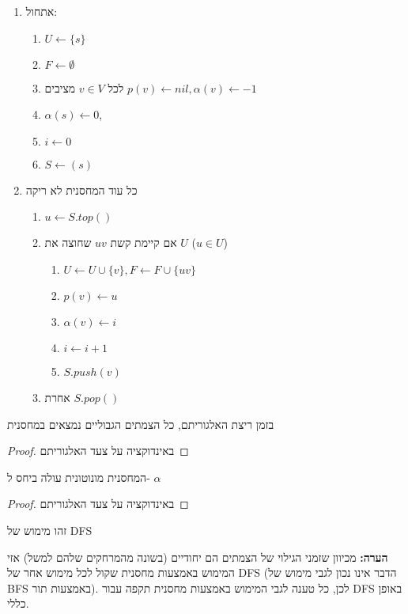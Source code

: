 \begin{enumerate}
\item
אתחול:
\begin{enumerate}
\item
$U \leftarrow \{s\}$
\item
$F \leftarrow \emptyset$
\item
לכל 
$v \in V$
מציבים
$p(v) \leftarrow nil, \alpha(v) \leftarrow -1$
\item
$\alpha(s) \leftarrow 0$,
\item
$i \leftarrow 0$
\item
$S \leftarrow (s)$
\end{enumerate}

\item
כל עוד המחסנית לא ריקה
\begin{enumerate}
	\item
	$u \leftarrow S.top()$
	\item 
	אם קיימת קשת 
	$uv$
	שחוצה את $U$ 
	($u \in U$)
		\begin{enumerate}
		\item
		$U \leftarrow U \cup \{v\}, F \leftarrow F \cup \{uv\}$
		\item
		$p(v) \leftarrow u$
		\item
		$\alpha(v) \leftarrow i$
		\item
		$i \leftarrow i + 1$
		\item
		$S.push(v)$
		\end{enumerate}
	\item
	אחרת 
	$S.pop()$
	\end{enumerate}
\end{enumerate}

\begin{claim}
בזמן ריצת האלגוריתם, כל הצמתים הגבוליים נמצאים במחסנית
\end{claim}
\begin{proof}
באינדוקציה על צעד האלגוריתם
\end{proof}
\begin{claim}
המחסנית מונוטונית עולה ביחס ל-%
$\alpha$
\end{claim}
\begin{proof}
באינדוקציה על צעד האלגוריתם
\end{proof}

\begin{corollary}
זהו מימוש של DFS
\end{corollary}

\textbf{הערה:}
מכיוון שזמני הגילוי של הצמתים הם יחודיים (בשונה מהמרחקים שלהם למשל) אזי המימוש באמצעות מחסנית
שקול לכל מימוש אחר של DFS (הדבר אינו נכון לגבי מימוש של BFS באמצעות תור).
לכן, כל טענה לגבי המימוש באמצעות מחסנית תקפה עבור DFS באופן כללי.

